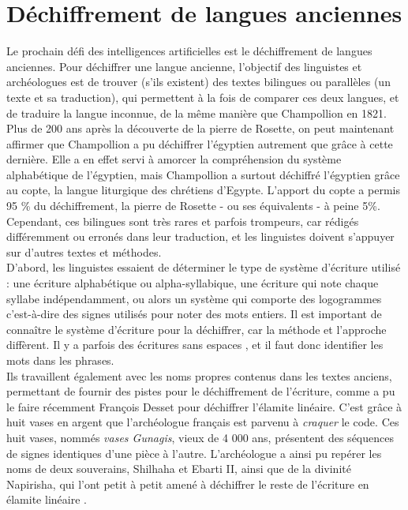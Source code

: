 \documentclass[12pt, twoside]{report}
\begin{document}
\section{Déchiffrement de langues anciennes}
Le prochain défi des intelligences artificielles est le déchiffrement de langues anciennes.  Pour déchiffrer une langue ancienne, l'objectif des linguistes et archéologues est de trouver (s'ils existent) des textes bilingues ou parallèles (un texte et sa traduction), qui permettent à la fois de comparer ces deux langues, et de traduire la langue inconnue, de la même manière que Champollion en 1821. Plus de 200 ans après la découverte de la pierre de Rosette, on peut maintenant affirmer que Champollion a pu déchiffrer l'égyptien autrement que grâce à cette dernière.  Elle a en effet servi à amorcer la compréhension du système alphabétique de l'égyptien, mais Champollion a surtout déchiffré l'égyptien grâce au copte, la langue liturgique des chrétiens d'Egypte. L'apport du copte a permis 95 \% du déchiffrement, la pierre de Rosette - ou ses équivalents - à peine 5\%. Cependant, ces bilingues sont très rares et parfois trompeurs, car rédigés différemment ou erronés dans leur traduction, et les linguistes doivent s'appuyer sur d'autres textes et méthodes.\\

D'abord, les linguistes essaient de déterminer le type de système d'écriture utilisé : une écriture alphabétique ou alpha-syllabique, une écriture qui note chaque syllabe indépendamment, ou alors un système qui comporte des logogrammes c'est-à-dire des signes utilisés pour noter des mots entiers. Il est important de connaître le système d'écriture pour la déchiffrer, car la méthode et l'approche diffèrent. Il y a parfois des écritures sans espaces \autocite{luo-et-al-2020}, et il faut donc identifier les mots dans les phrases. \\ 
\indent Ils travaillent également avec les noms propres contenus dans les textes anciens, permettant de fournir des pistes pour le déchiffrement de l'écriture, comme a pu le faire récemment François Desset pour déchiffrer l'élamite linéaire. C'est grâce à huit vases en argent que l'archéologue français est parvenu à \textit{craquer} le code. Ces huit vases, nommés \textit{vases Gunagis}, vieux de 4 000 ans, présentent des séquences de signes identiques d'une pièce à l'autre. L'archéologue a ainsi pu repérer les noms de deux souverains, Shilhaha et Ebarti II, ainsi que de la divinité Napirisha, qui l'ont petit à petit amené à déchiffrer le reste de l'écriture en élamite linéaire \autocite{linear-elamite-writing}.\\
\end{document}
